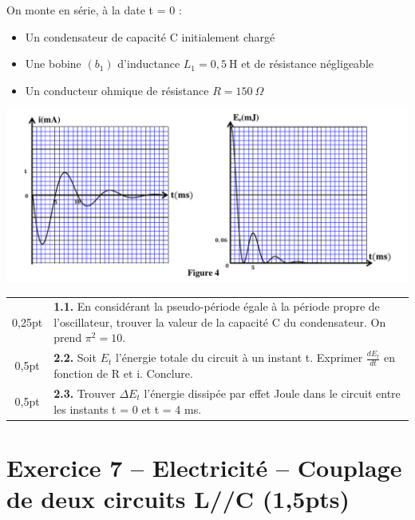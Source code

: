 \documentclass[12pt]{article}
\begin{document}
On monte en série, à la date t = 0 :

\begin{itemize}
\item Un condensateur de capacité C initialement chargé
\item Une bobine $(b_1)$ d'inductance $L_1 = 0,5\ \text{H}$ et de résistance négligeable
\item Un conducteur ohmique de résistance $R = 150\ \Omega$
\end{itemize}


\begin{center}
	\includegraphics[width=1\textwidth]{./img/RLC_01.png}
  \end{center}


\begin{tabular}{c|l}	

	0,25pt & \makecell[l]{\textbf{1.1. } En considérant la pseudo-période égale à la période propre de l'oscillateur, trouver la \\valeur de la capacité C du condensateur. On prend $\pi^2 = 10$.}\\
		0,5pt & \makecell[l]{\textbf{2.2. } Soit $E_t$ l'énergie totale du circuit à un instant t. Exprimer $\frac{dE_t}{dt}$ en fonction de R et i. \\Conclure.
}\\
		0,5pt & \makecell[l]{\textbf{2.3. } Trouver $\Delta E_t$ l'énergie dissipée par effet Joule dans le circuit entre \\les instants t = 0 et t = 4 ms.
}\\

\end{tabular}


\section*{Exercice 7 – Electricité –   Couplage de deux circuits L//C \dotfill(1,5pts)}
\end{document}
